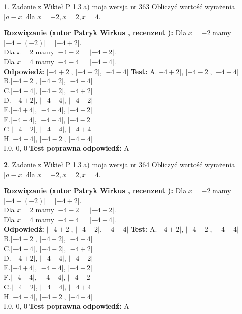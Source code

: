 \documentclass[12pt, a4paper]{article}
\theoremstyle{definition} %
\newtheorem{zad}{}
\newcommand{\zadStart}[1]{\begin{zad}#1\newline}
\newcommand{\zadStop}{\end{zad}}
\newcommand{\rozwStart}[2]{\noindent \textbf{Rozwiązanie (autor #1 , recenzent #2): }\newline}
\newcommand{\rozwStop}{\newline}
\newcommand{\odpStart}{\noindent \textbf{Odpowiedź:}\newline}
\newcommand{\odpStop}{\newline}
\newcommand{\testStart}{\noindent \textbf{Test:}\newline}
\newcommand{\testStop}{\newline}
\newcommand{\kluczStart}{\noindent \textbf{Test poprawna odpowiedź:}\newline}
\newcommand{\kluczStop}{\newline}
\begin{document}
\zadStart{Zadanie z Wikieł P 1.3 a) moja wersja nr 363}
Obliczyć wartość wyrażenia $|a - x|$ dla $x=-2,x=2,x=4$.
\zadStop
\rozwStart{Patryk Wirkus}{}
Dla $x = -2$ mamy $|-4 - (-2)| = |-4 + 2|$.\\
Dla $x = 2$ mamy $|-4 - 2| = |-4 - 2|$.\\
Dla $x = 4$ mamy $|-4 - 4| = |-4 - 4|$.\\
\rozwStop
\odpStart
$|-4 + 2|$, $|-4 - 2|$, $|-4 - 4|$
\odpStop
\testStart
A.$|-4 + 2|$, $|-4 - 2|$, $|-4 - 4|$\\
B.$|-4 - 2|$, $|-4 + 2|$, $|-4 - 4|$\\
C.$|-4 - 4|$, $|-4 - 2|$, $|-4 + 2|$\\
D.$|-4 + 2|$, $|-4 - 4|$, $|-4 - 2|$\\
E.$|-4 + 4|$, $|-4 - 4|$, $|-4 - 2|$\\
F.$|-4 - 4|$, $|-4 + 4|$, $|-4 - 2|$\\
G.$|-4 - 2|$, $|-4 - 4|$, $|-4 + 4|$\\
H.$|-4 + 4|$, $|-4 - 2|$, $|-4 - 4|$\\
I.$0$, $0$, $0$
\testStop
\kluczStart
A
\kluczStop



\zadStart{Zadanie z Wikieł P 1.3 a) moja wersja nr 364}
Obliczyć wartość wyrażenia $|a - x|$ dla $x=-2,x=2,x=4$.
\zadStop
\rozwStart{Patryk Wirkus}{}
Dla $x = -2$ mamy $|-4 - (-2)| = |-4 + 2|$.\\
Dla $x = 2$ mamy $|-4 - 2| = |-4 - 2|$.\\
Dla $x = 4$ mamy $|-4 - 4| = |-4 - 4|$.\\
\rozwStop
\odpStart
$|-4 + 2|$, $|-4 - 2|$, $|-4 - 4|$
\odpStop
\testStart
A.$|-4 + 2|$, $|-4 - 2|$, $|-4 - 4|$\\
B.$|-4 - 2|$, $|-4 + 2|$, $|-4 - 4|$\\
C.$|-4 - 4|$, $|-4 - 2|$, $|-4 + 2|$\\
D.$|-4 + 2|$, $|-4 - 4|$, $|-4 - 2|$\\
E.$|-4 + 4|$, $|-4 - 4|$, $|-4 - 2|$\\
F.$|-4 - 4|$, $|-4 + 4|$, $|-4 - 2|$\\
G.$|-4 - 2|$, $|-4 - 4|$, $|-4 + 4|$\\
H.$|-4 + 4|$, $|-4 - 2|$, $|-4 - 4|$\\
I.$0$, $0$, $0$
\testStop
\kluczStart
A
\kluczStop
\end{document}
